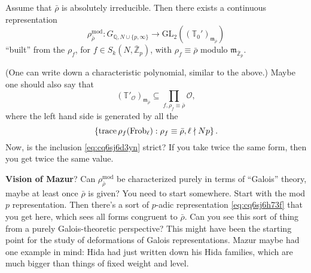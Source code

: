 \documentclass[reqno]{amsart} 
\numberwithin{theorem}{section}
\numberwithin{equation}{section}
\numberwithin{exercise}{section}
\begin{document}
\begin{theorem}\label{theorem:cq6thpm721}
  Assume that $\bar{\rho}$ is absolutely irreducible.  Then there exists a continuous representation
  \begin{equation}\label{eq:cq6sj6h73f}
    \rho_{\bar{\rho}}^{\mathrm{mod}} : G_{\mathbb{Q}, N \cup \{p, \infty\}} \rightarrow \mathrm{GL}_2 \left((\mathbb{T}_0 ')_{\mathfrak{m}_{\bar{\rho}}} \right)
  \end{equation}
  ``built'' from the $\rho_f$, for $f \in S_k(N, \bar{\mathbb{Z}}_p)$, with $\rho_f \equiv \bar{\rho}$ modulo $\mathfrak{m}_{\bar{\mathbb{Z}}_p}$.
\end{theorem}
(One can write down a characteristic polynomial, similar to the above.)  Maybe one should also say that
\begin{equation}\label{eq:cq6sj6d3yn}
  \left( \mathbb{T} '_{\mathcal{O}} \right)_{\mathfrak{m}_{\bar{\rho}}} \subseteq \prod_{f, \rho_f \equiv \bar{\rho}} \mathcal{O},
\end{equation}
where the left hand side is generated by all the
\begin{equation*}
  \left\{ \operatorname{trace} \rho_f(\operatorname{Frob}_{\ell}) : \rho_f \equiv \bar{\rho}, \ell \nmid N p \right\}.
\end{equation*}
Now, is the inclusion \eqref{eq:cq6sj6d3yn} strict?  If you take twice the same form, then you get twice the same value.

\textbf{Vision of Mazur}?  Can $\rho_{\bar{\rho}}^{\mathrm{mod}}$ be characterized purely in terms of ``Galois'' theory, maybe at least once $\bar{\rho}$ is given?  You need to start somewhere.  Start with the mod $p$ representation.  Then there's a sort of $p$-adic representation \eqref{eq:cq6sj6h73f} that you get here, which sees all forms congruent to $\bar{\rho}$.  Can you see this sort of thing from a purely Galois-theoretic perspective?  This might have been the starting point for the study of deformations of Galois representations.  Mazur maybe had one example in mind: Hida had just written down his Hida families, which are much bigger than things of fixed weight and level.
\end{document}
